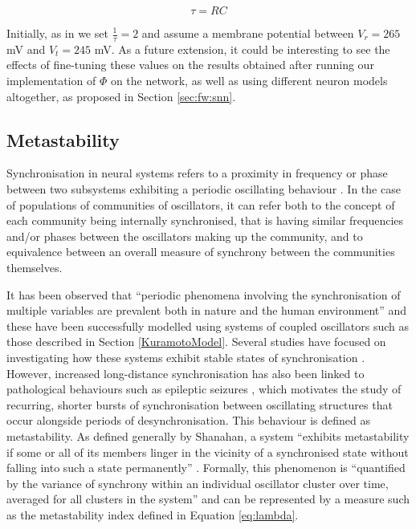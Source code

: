 \documentclass[a4paper,11pt]{article}
\begin{document}
\begin{equation} \label{eq:tau}
\tau = RC
\end{equation}

Initially, as in \cite{Bhowmik2013} we set $\frac{1}{\tau} = 2$ and assume a membrane potential between $V_r = 265$ mV and $V_t = 245$ mV. As a future extension, it could be interesting to see the effects of fine-tuning these values on the results obtained after running our implementation of $\Phi$ on the network, as well as using different neuron models altogether, as proposed in Section \ref{sec:fw:snn}.

\subsection{Metastability}
\label{sec:bg:meta}
Synchronisation in neural systems refers to a proximity in frequency or phase between two subsystems exhibiting a periodic oscillating behaviour \cite{Abarbanel1996}. In the case of populations of communities of oscillators, it can refer both to the concept of each community being internally synchronised, that is having similar frequencies and/or phases between the oscillators making up the community, and to equivalence between an overall measure of synchrony between the communities themselves.

It has been observed that ``periodic phenomena involving the synchronisation of multiple variables are prevalent both in nature and the human environment'' \cite{Shanahan2010} and these have been successfully modelled using systems of coupled oscillators such as those described in Section \ref{KuramotoModel}. Several studies have focused on investigating how these systems exhibit stable states of synchronisation \cite{Acebron2005}. However, increased long-distance synchronisation has also been linked to pathological behaviours such as epileptic seizures \cite{Arthuis2009}, which motivates the study of recurring, shorter bursts of synchronisation between oscillating structures that occur alongside periods of desynchronisation. This behaviour is defined as metastability. As defined generally by Shanahan, a system ``exhibits metastability if some or all of its members linger in the vicinity of a synchronised state without falling into such a state permanently'' \cite{Shanahan2010}. Formally, this phenomenon is ``quantified by the variance of synchrony within an individual oscillator cluster over time, averaged for all clusters in the system'' \cite{Bhowmik2013} and can be represented by a measure such as the metastability index defined in Equation \ref{eq:lambda}.
\end{document}
